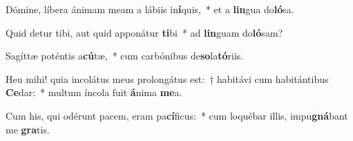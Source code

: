 \item Dómine, líbera ánimam meam a lábiis in\textbf{í}quis,~* et a \textbf{lin}gua do\textbf{ló}sa.
\item Quid detur tibi, aut quid apponátur \textbf{ti}bi~* ad \textbf{lin}guam do\textbf{ló}sam?
\item Sagíttæ poténtis a\textbf{cú}tæ,~* cum carbónibus de\textbf{so}la\textbf{tó}riis.
\item Heu mihi! quia incolátus meus prolongátus est:~† habitávi cum habitántibus \textbf{Ce}dar:~* multum íncola fuit \textbf{á}nima \textbf{me}a.
\item Cum his, qui odérunt pacem, eram pa\textbf{cí}ficus:~* cum loquébar illis, impu\textbf{gná}bant me \textbf{gra}tis.
